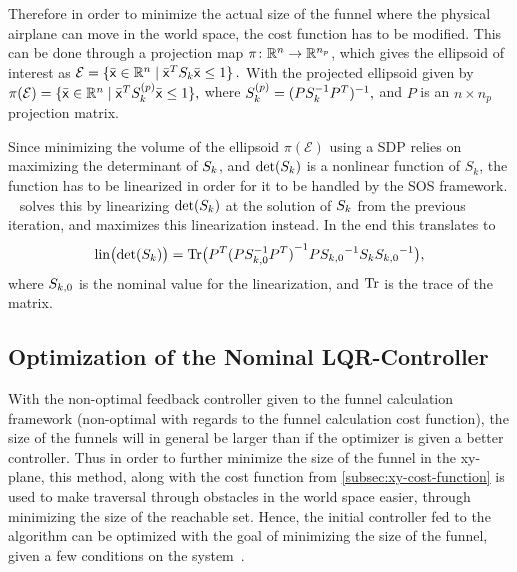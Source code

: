 Therefore in order to minimize the actual size of the funnel where the physical
airplane can move in the world space, the cost function has to be modified. This
can be done through a projection map \(\pi \colon \mathbb{R}^n \rightarrow \mathbb{R}^{n_p}\),
which gives the ellipsoid of interest as \( \mathcal{E} = \lbrace\bar{{\mathbf{\mathsf{x}}}}
  \in \mathbb{R}^n \mid \bar{{\mathbf{\mathsf{x}}}}^TS_{k}\bar{{\mathbf{\mathsf{x}}}} \leq 1\rbrace \, . \) With the
projected ellipsoid given by \( \pi(\mathcal{E}) = \lbrace\bar{{\mathbf{\mathsf{x}}}} \in \mathbb{R}^n
  \mid \bar{{\mathbf{\mathsf{x}}}}^TS^{(p)}_{k}\bar{{\mathbf{\mathsf{x}}}} \leq 1\rbrace, \) where \( S_k^{(p)}
= \lparen PS_k^{-1}P^T\rparen^{-1}, \) and \(P\) is an \(n\times n_p\) projection matrix.

Since minimizing the volume of the ellipsoid \(\pi(\mathcal{E})\) using a
\acl{SDP} relies on maximizing the determinant of \(S_k\), and \(\operatorname{det}(
S_k)\) is a nonlinear function of \(S_k\), the function has to be
linearized in order for it to be handled by the \ac{SOS} framework.
\citeauthor{majumdarFunnelLibrariesRealtime2017}~\cite{majumdarFunnelLibrariesRealtime2017}
solves this by linearizing \(\operatorname{det}(S_k)\) at the solution of
\(S_k\) from the previous iteration, and maximizes this linearization
instead. In the end this translates to
\begin{equation}
  \operatorname{lin} \bigl( \operatorname{det} \lparen S_k\rparen \bigr) = \operatorname{Tr} \bigl( P^{T}{\lparen P
      S_{k,0}^{-1} P^T\rparen}^{-1} P {S_{k,0}}^{-1}
    S_k {S_{k,0}}^{-1} \bigr),
\end{equation} 
where \( S_{k,0}\) is the nominal value for the linearization, and \(\operatorname{Tr}\)
is the trace of the matrix.

\subsection{Optimization of the Nominal \ac{LQR}-Controller}
\label{subsec:searching-for-a-controller}

With the non-optimal feedback controller given to the funnel calculation
framework (non-optimal with regards to the funnel calculation cost function),
the size of the funnels will in general be larger than if the optimizer is given
a better controller. Thus in order to further minimize the size of the funnel in
the xy-plane, this method, along with the cost function from
\cref{subsec:xy-cost-function} is used to make traversal through obstacles in
the world space easier, through minimizing the size of the reachable set. Hence,
the initial controller fed to the algorithm can be optimized with the goal of
minimizing the size of the funnel, given a few conditions on the
system~\cite[sec~4.3.2]{majumdarFunnelLibrariesRealtime2017}.

